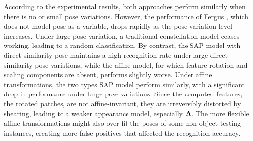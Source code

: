 
According to the experimental results, both approaches perform similarly when there is no or small pose variations. However, the performance of Fergus \etal \cite{Fergus2007}, which does not model pose as a variable, drops rapidly as the pose variation level increases. Under large pose variation, a traditional constellation model \cite{Fergus2007} ceases working, leading to a random classification. 
By contrast, the SAP model with direct similarity pose maintains a high recognition rate under large direct similarity pose variations, while the affine model, for which feature rotation and scaling components are absent, performs slightly worse. 
Under affine transformations, the two types SAP model perform similarly, with a significant drop in performance under large pose variations. Since the computed features, \ie the rotated patches, are not affine-invariant, they are irreversibly distorted by shearing, leading to a weaker appearance model, especially $\mathbf{A}$.
The more flexible affine transformations might also over-fit the poses of some non-object testing instances, creating more false positives that affected the recognition accuracy. 

